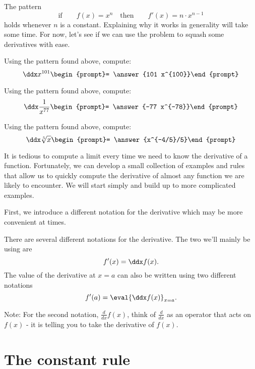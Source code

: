 \documentclass{ximera}
\begin{document}
The pattern
\[
  \text{if} \qquad f(x) = x^n\quad\text{then}\qquad f'(x) = n\cdot x^{n-1}
\]
holds whenever $n$ is a constant. Explaining why it works in
generality will take some time. For now, let's see if we can use the
problem to squash some derivatives with ease.

\begin{problem}
  Using the pattern found above, compute:
  \[
  \ddx x^{101} \begin{prompt}= \answer{101 x^{100}}\end{prompt}
  \]
\end{problem}

\begin{problem}
  Using the pattern found above, compute:
  \[
  \ddx \frac{1}{x^{77}} \begin{prompt}= \answer{-77 x^{-78}}\end{prompt}
  \]
\end{problem}


\begin{problem}
  Using the pattern found above, compute:
  \[
  \ddx \sqrt[5]{x} \begin{prompt}= \answer{x^{-4/5}/5}\end{prompt}
  \]
\end{problem}


It is tedious to compute a limit every time we need to know the
derivative of a function.  Fortunately, we can develop a small
collection of examples and rules that allow us to quickly compute the
derivative of almost any function we are likely to encounter.  We will
start simply and build up to more complicated examples.

First, we introduce a different notation for the derivative which may be more convenient at times.
\begin{definition}
  There are several different notations for the derivative.  The two we'll mainly be using are
   \[
 f'(x)= \ddx f(x).
  \]
  The value of the derivative at $x=a$ can also be written using two different notations
  \[
 f'(a)= \eval{\ddx f(x)}_{x=a}. 
  \]
\end{definition}

Note: For the second notation, $\displaystyle \frac{d}{dx} f(x)$, think of $\displaystyle \frac{d}{dx}$ as an operator that acts on $f(x)$ - it is telling you to take the derivative of $f(x)$.


\section{The constant rule}
\end{document}
